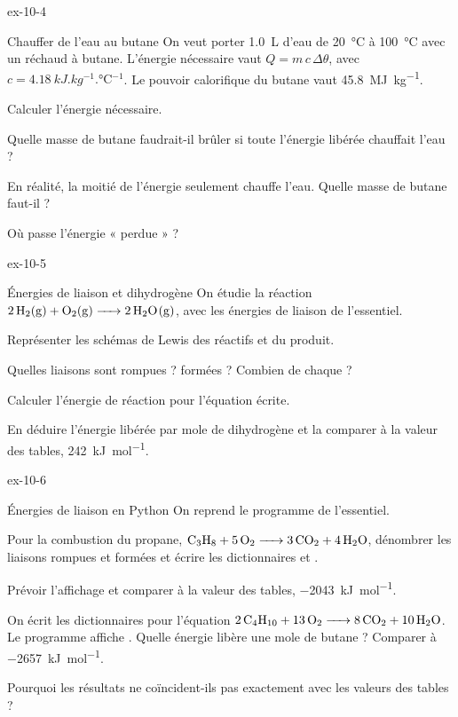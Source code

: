 \begin{blocLivre}{ex-10-4}
\begin{exercice}[1]{Chauffer de l'eau au butane}
On veut porter \qty{1,0}{L} d'eau de \qty{20}{\degreeCelsius} à \qty{100}{\degreeCelsius} avec un réchaud à butane. L'énergie nécessaire vaut $Q=m\,c\,\Delta\theta$,
avec $c=\qty{4,18}{kJ.kg^{-1}.\degreeCelsius^{-1}}$. Le pouvoir calorifique du butane vaut \qty{45,8}{MJ.kg^{-1}}.
\begin{questions}
\item Calculer l'énergie nécessaire.
\item Quelle masse de butane faudrait-il brûler si toute l'énergie libérée chauffait l'eau ?
\item En réalité, la moitié de l'énergie seulement chauffe l'eau. Quelle masse de butane faut-il ?
\item Où passe l'énergie « perdue » ?
\end{questions}
\end{exercice}
\end{blocLivre}
\begin{blocLivre}{ex-10-5}
\begin{exercice}[1]{Énergies de liaison et dihydrogène}
On étudie la réaction $\ce{2H2(g) + O2(g) -> 2H2O(g)}$, avec les énergies de liaison de l'essentiel.
\begin{questions}
\item Représenter les schémas de Lewis des réactifs et du produit.
\item Quelles liaisons sont rompues ? formées ? Combien de chaque ?
\item Calculer l'énergie de réaction pour l'équation écrite.
\item En déduire l'énergie libérée par mole de dihydrogène et la comparer à la valeur des tables, \qty{242}{kJ.mol^{-1}}.
\end{questions}
\end{exercice}
\end{blocLivre}
\begin{blocLivre}{ex-10-6}
\begin{exercice}[2]{Énergies de liaison en Python}
On reprend le programme de l'essentiel.
\begin{questions}
\item {}Pour la combustion du propane, $\ce{C3H8 + 5O2 -> 3CO2 + 4H2O}$, dénombrer les liaisons rompues et formées et écrire
les dictionnaires  et .
\item Prévoir l'affichage et comparer à la valeur des tables, \qty{-2043}{kJ.mol^{-1}}.
\item On écrit les dictionnaires pour l'équation $\ce{2C4H10 + 13O2 -> 8CO2 + 10H2O}$. Le programme affiche . Quelle énergie
libère une mole de butane ? Comparer à \qty{-2657}{kJ.mol^{-1}}.
\item Pourquoi les résultats ne coïncident-ils pas exactement avec les valeurs des tables ?
\end{questions}
\end{exercice}
\end{blocLivre}
